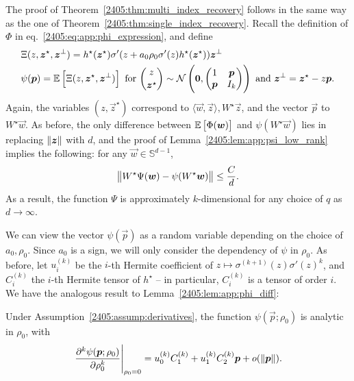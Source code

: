 The proof of Theorem~\ref{2405:thm:multi_index_recovery} follows in the same way as the one of Theorem~\ref{2405:thm:single_index_recovery}. Recall the definition of $\Phi$ in eq.~\eqref{2405:eq:app:phi_expression}, and define
\begin{align}
    &\Xi(z, {\boldsymbol{z}}^\star, {\boldsymbol{z}}^\bot) = h^\star({\boldsymbol{z}}^\star) \sigma'(z + a_0\rho_0\sigma'(z)h^\star({\boldsymbol{z}}^\star)) {\boldsymbol{z}}^\bot \\
    &\psi({\boldsymbol{p}}) = \mathbb{E}\left[\Xi(z, {\boldsymbol{z}}^\star, {\boldsymbol{z}}^\bot)\right] \  \text{for} \  \dbinom{z}{{\boldsymbol{z}}^\star} \sim  \mathcal{N}\left( {\boldsymbol{0}},
    \begin{pmatrix}
      1 & {\boldsymbol{p}} \\
      {\boldsymbol{p}} & I_k
  \end{pmatrix} \right) \  \text{and} \  {\boldsymbol{z}}^\bot = {\boldsymbol{z}}^\star - z{\boldsymbol{p}}.\label{2405:eq:app:def_psi}
\end{align}
Again, the variables $(z, \vec{z}^\star)$ correspond to $\langle \vec{w}, \vec{z} \rangle, W^\star\vec{z}$, and the vector $\vec{p}$ to $W^\star\vec{w}$. As before, the only difference between $\mathbb{E}\left[\Phi({\boldsymbol{w}})\right]$ and $\psi(W^\star \vec{w})$ lies in replacing $\left\lVert {\boldsymbol{z}}\right\rVert$ with $d$, and the proof of Lemma~\ref{2405:lem:app:psi_low_rank} implies the following: for any $\vec{w}\in \mathbb{S}^{d-1}$,
\[ \left\lVert W^\star\Psi({\boldsymbol{w}}) - \psi(W^\star {\boldsymbol{w}})\right\rVert \leq \frac Cd. \]
As a result, the function $\Psi$ is approximately $k$-dimensional for any choice of $q$ as $d \to \infty$. 

We can view the vector $\psi(\vec{p})$ as a random variable depending on the choice of $a_0, \rho_0$. Since $a_0$ is a sign, we will only consider the dependency of $\psi$ in $\rho_0$. As before, let $u_i^{(k)}$ be the $i$-th Hermite coefficient of $z \mapsto \sigma^{(k+1)}(z) \sigma'(z)^k$, and $C_i^{(k)}$ the $i$-th Hermite tensor of $h^\star$ \citep{grad1949note} -- in particular, $C_i^{(k)}$ is a tensor of order $i$.
We have the analogous result to Lemma~\ref{2405:lem:app:phi_diff}:

\begin{lemma}
    Under Assumption~\ref{2405:assump:derivatives}, the function $\psi(\vec{p}; \rho_0)$ is analytic in $\rho_0$, with
    \[  \left.\frac{\partial^k \psi({\boldsymbol{p}}; \rho_0)}{\partial \rho_0^k}\right|_{\rho_0 = 0} = u_0^{(k)}C_1^{(k)} + u_1^{(k)}C_2^{(k)} {\boldsymbol{p}} + o(\left\lVert {\boldsymbol{p}}\right\rVert). \]
\end{lemma}

